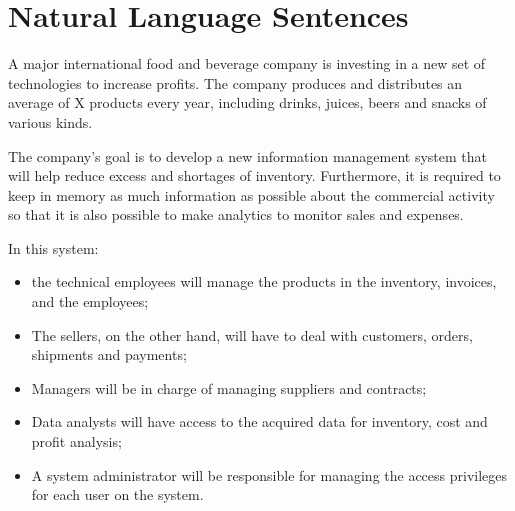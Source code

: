 \section{Natural Language Sentences}

A major international food and beverage company is investing in a new set of technologies to increase profits.
The company produces and distributes an average of X products every year, including drinks, juices, beers and snacks of various kinds.

The company's goal is to develop a new information management system that will help reduce excess and shortages of inventory.
Furthermore, it is required to keep in memory as much information as possible about the commercial activity so that
it is also possible to make analytics to monitor sales and expenses.

In this system:
\begin{itemize}
    \item the technical employees will manage the products in the inventory, invoices, and the employees;
    \item The sellers, on the other hand, will have to deal with customers, orders, shipments and payments;
    \item Managers will be in charge of managing suppliers and contracts;
    \item Data analysts will have access to the acquired data for inventory, cost and profit analysis;
    \item A system administrator will be responsible for managing the access privileges for each user on the system.
\end{itemize}

